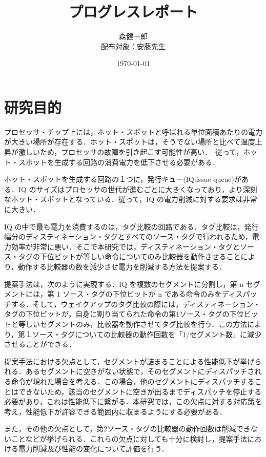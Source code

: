 \documentclass[twocolumn]{jsarticle}
\begin{document}
  \title{プログレスレポート}
  \date{\today}
  \author{森健一郎\\配布対象：安藤先生}
  
  \maketitle
  
  \section{研究目的}
  プロセッサ・チップ上には，ホット・スポットと呼ばれる単位面積あたりの電力が大きい場所が存在する．ホット・スポットは，そうでない場所と比べて温度上昇が激しいため，プロセッサの故障を引き起こす可能性が高い．~\cite{Weste2010,Monsieur2001,Khan2010,Black1969,Viswanath2000}従って，ホット・スポットを生成する回路の消費電力を低下させる必要がある．

  ホット・スポットを生成する回路の１つに，発行キュー(IQ:issue queue)がある．IQ のサイズはプロセッサの世代が進むごとに大きくなっており，より深刻なホット・スポットとなっている．従って，IQ の電力削減に対する要求は非常に大きい．
  
  IQ の中で最も電力を消費するのは，タグ比較の回路である．タグ比較は，発行幅分のディスティネーション・タグとすべてのソース・タグで行われるため，電力効率が非常に悪い．そこで本研究では，ディスティネーション・タグとソース・タグの下位ビットが等しい命令についてのみ比較器を動作させることにより，動作する比較器の数を減少させ電力を削減する方法を提案する．

  提案手法は，次のように実現する．IQ を複数のセグメントに分割し，第 n セグメントには，第 1 ソース・タグの下位ビットが n である命令のみをディスパッチする．そして，ウェイクアップのタグ比較の際には，ディスティネーション・タグの下位ビットが，自身に割り当てられた命令の第1ソース・タグの下位ビットと等しいセグメントのみ，比較器を動作させてタグ比較を行う．この方法により，第１ソース・タグについての比較器の動作回数を「1/セグメント数」に減少させることができる．

  提案手法における欠点として，セグメントが詰まることによる性能低下が挙げられる．あるセグメントに空きがない状態で，そのセグメントにディスパッチされる命令が現れた場合を考える．この場合，他のセグメントにディスパッチすることはできないため，該当のセグメントに空きが出るまでディスパッチを停止する必要があり，これは性能低下に繋がる．本研究では，この欠点に対する対応策を考え，性能低下が許容できる範囲内に収まるようにする必要がある．

  また，その他の欠点として，第2ソース・タグの比較器の動作回数は削減できないことなどが挙げられる．これらの欠点に対しても十分に検討し，提案手法における電力削減及び性能の変化について評価を行う．
  
\end{document}
